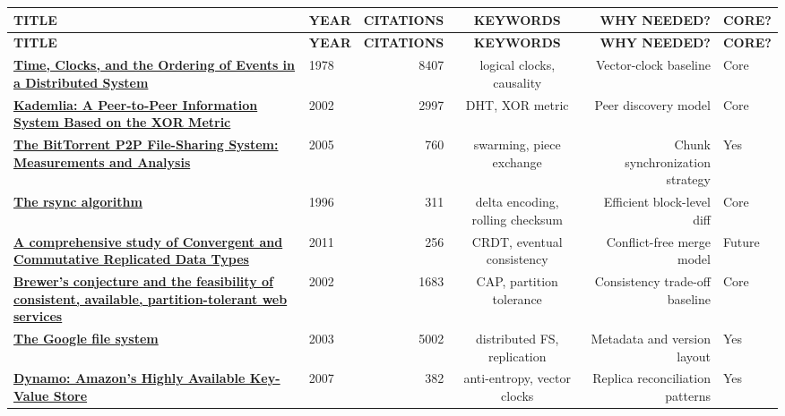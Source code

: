 \documentclass[11pt,oneside]{article}
\begin{document}
\renewcommand{\arraystretch}{1.3}
\scriptsize
\setlength{\LTleft}{0pt}
\setlength{\LTright}{0pt}
\begin{longtable}{|L|Y|N|C|D|K|}
\hline
\textbf{TITLE} & \textbf{YEAR} & \textbf{CITATIONS} & \textbf{KEYWORDS} & \textbf{WHY NEEDED?} & \textbf{CORE?} \\
\hline
\endfirsthead

\hline
\textbf{TITLE} & \textbf{YEAR} & \textbf{CITATIONS} & \textbf{KEYWORDS} & \textbf{WHY NEEDED?} & \textbf{CORE?} \\
\hline
\endhead

\href{https://doi.org/10.1145/359545.359563}{\textbf{Time, Clocks, and the Ordering of Events in a Distributed System}} & 1978 & 8407 &
logical clocks, causality & Vector-clock baseline & Core \\
\hline

\href{https://doi.org/10.1007/3-540-45748-8_5}{\textbf{Kademlia: A Peer-to-Peer Information System Based on the XOR Metric}} & 2002 & 2997 &
DHT, XOR metric & Peer discovery model & Core \\
\hline

\href{https://doi.org/10.1007/11558989_19}{\textbf{The BitTorrent P2P File-Sharing System: Measurements and Analysis}} & 2005 & 760 &
swarming, piece exchange & Chunk synchronization strategy & Yes \\
\hline

\href{https://rsync.samba.org/tech_report/}{\textbf{The rsync algorithm}} & 1996 & 311 &
delta encoding, rolling checksum & Efficient block-level diff & Core \\
\hline

\href{https://hal.inria.fr/inria-00609399/document}{\textbf{A comprehensive study of Convergent and Commutative Replicated Data Types}} & 2011 & 256 &
CRDT, eventual consistency & Conflict-free merge model & Future \\
\hline

\href{https://doi.org/10.1145/564585.564601}{\textbf{Brewer's conjecture and the feasibility of consistent, available, partition-tolerant web services}} & 2002 & 1683 &
CAP, partition tolerance & Consistency trade-off baseline & Core \\
\hline

\href{https://doi.org/10.1145/1165389.945450}{\textbf{The Google file system}} & 2003 & 5002 &
distributed FS, replication & Metadata and version layout & Yes \\
\hline

\href{https://www.allthingsdistributed.com/files/amazon-dynamo-sosp2007.pdf}{\textbf{Dynamo: Amazon's Highly Available Key-Value Store}} & 2007 & 382 &
anti-entropy, vector clocks & Replica reconciliation patterns & Yes \\
\hline


\end{longtable}
\end{document}
